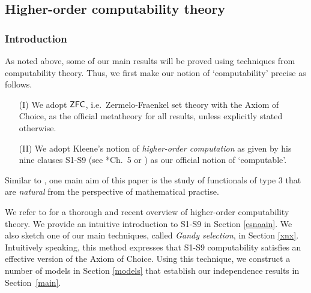 \documentclass[reqno]{amsart}
\def\ZFC{\textup{\textsf{ZFC}}}
\numberwithin{equation}{section}
\numberwithin{thm}{section}
\begin{document}
\subsection{Higher-order computability theory}\label{HCT}
\subsubsection{Introduction}
As noted above, some of our main results will be proved using techniques from computability theory.
Thus, we first make our notion of `computability' precise as follows.  
\begin{enumerate}
\item[(I)] We adopt $\ZFC$, i.e.\ Zermelo-Fraenkel set theory with the Axiom of Choice, as the official metatheory for all results, unless explicitly stated otherwise.
\item[(II)] We adopt Kleene's notion of \emph{higher-order computation} as given by his nine clauses S1-S9 (see \cite{longmann}*{Ch.\ 5} or \cite{kleeneS1S9}) as our official notion of `computable'.
\end{enumerate}
Similar to \cites{dagsam,dagsamII, dagsamIII, dagsamV, dagsamVI, dagsamVII}, one main aim of this paper is the study of functionals of type 3 that are \emph{natural} from the perspective of mathematical practise. 

\smallskip

We refer to \cite{longmann} for a thorough and recent overview of higher-order computability theory.  
We provide an intuitive introduction to S1-S9 in Section \ref{esnaain}.
We also sketch one of our main techniques, called \emph{Gandy selection}, in Section \ref{xnx}.  
Intuitively speaking, this method expresses that S1-S9 computability satisfies an effective version of the Axiom of Choice. 
Using this technique, we construct a number of models in Section \ref{models} that establish our independence results in Section~\ref{main}.
\end{document}

